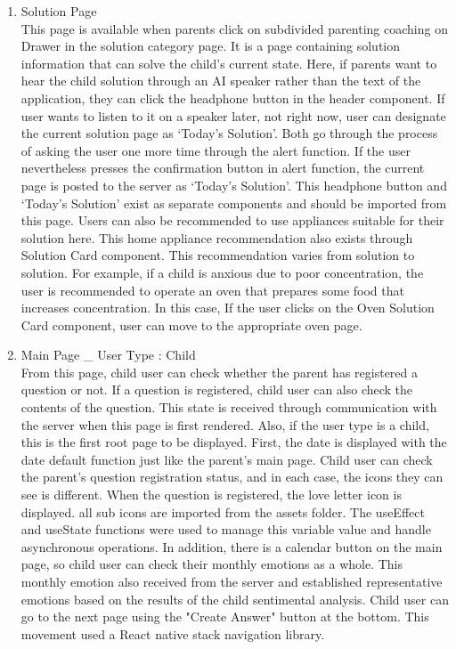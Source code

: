 \documentclass[conference]{IEEEtran}
\begin{document}
\begin{enumerate}
\begin{enumerate}
\begin{enumerate}
               \item Solution Page
               \\This page is available when parents click on subdivided parenting coaching on Drawer in the solution category page. It is a page containing solution information that can solve the child's current state. Here, if parents want to hear the child solution through an AI speaker rather than the text of the application, they can click the headphone button in the header component. If user wants to listen to it on a speaker later, not right now, user can designate the current solution page as ‘Today's Solution’. Both go through the process of asking the user one more time through the alert function. If the user nevertheless presses the confirmation button in alert function, the current page is posted to the server as ‘Today's Solution’. This headphone button and ‘Today's Solution' exist as separate components and should be imported from this page. Users can also be recommended to use appliances suitable for their solution here. This home appliance recommendation also exists through Solution Card component. This recommendation varies from solution to solution. For example, if a child is anxious due to poor concentration, the user is recommended to operate an oven that prepares some food that increases concentration. In this case, If the user clicks on the Oven Solution Card component, user can move to the appropriate oven page.
               \item Main Page \_ User Type : Child
               \\From this page, child user can check whether the parent has registered a question or not. If a question is registered, child user can also check the contents of the question. This state is received through communication with the server when this page is first rendered. Also, if the user type is a child, this is the first root page to be displayed. First, the date is displayed with the date default function just like the parent's main page. Child user can check the parent's question registration status, and in each case, the icons they can see is different. When the question is registered, the love letter icon is displayed. all sub icons are imported from the assets folder. The useEffect and useState functions were used to manage this variable value and handle asynchronous operations. In addition, there is a calendar button on the main page, so child user can check their monthly emotions as a whole. This monthly emotion also received from the server and established representative emotions based on the results of the child sentimental analysis. Child user can go to the next page using the "Create Answer" button at the bottom. This movement used a React native stack navigation library.

\end{enumerate}
\end{enumerate}
\end{enumerate}
\end{document}
